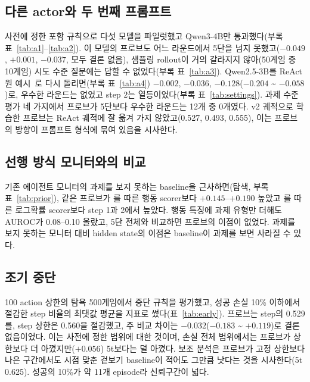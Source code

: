 \documentclass[10pt]{article}
\begin{document}
\subsection{다른 actor와 두 번째 프롬프트}\label{sec:actors}
사전에 정한 포함 규칙으로 다섯 모델을 파일럿했고 Qwen3-4B만 통과했다(부록 표~\ref{tab:a1}--\ref{tab:a2}). 이 모델의 프로브도 어느 라운드에서 5단을 넘지 못했고($-0.049$, $+0.001$, $-0.037$, 모두 결론 없음), 샘플링 rollout이 거의 갈라지지 않아(50게임 중 10게임) 시도 수준 질문에는 답할 수 없었다(부록 표~\ref{tab:a3}).
Qwen2.5-3B를 ReAct 원 예시~\cite{yao2023react}로 다시 돌리면(부록 표~\ref{tab:a4}) $-0.002$, $-0.036$, $-0.128$($-0.204$ \textasciitilde{} $-0.058$)로, 우수한 라운드는 없었고 step 2는 열등이었다(부록 표~\ref{tab:settings}).
과제 수준 평가 네 가지에서 프로브가 5단보다 우수한 라운드는 12개 중 0개였다. v2 궤적으로 학습한 프로브는 ReAct 궤적에 잘 옮겨 가지 않았고(0.527, 0.493, 0.555), 이는 프로브의 방향이 프롬프트 형식에 묶여 있음을 시사한다.

\subsection{선행 방식 모니터와의 비교}\label{sec:prior}
기존 에이전트 모니터의 과제를 보지 못하는 baseline을 근사하면(탐색, 부록 표~\ref{tab:prior}), 같은 프로브가 \cite{ruan2026doomed}를 따른 행동 scorer보다 $+0.145$--$+0.190$ 높았고 \cite{pham2026agentstop}를 따른 로그확률 scorer보다 step 1과 2에서 높았다.
행동 특징에 과제 유형만 더해도 AUROC가 0.08--0.10 올랐고, 5단 전체와 비교하면 프로브의 이점이 없었다. 과제를 보지 못하는 모니터 대비 hidden state의 이점은 baseline이 과제를 보면 사라질 수 있다.

\subsection{조기 중단}
100 action 상한의 탐욕 500게임에서 중단 규칙을 평가했고, 성공 손실 10\% 이하에서 절감한 step 비율의 최댓값 평균을 지표로 썼다(표~\ref{tab:early}). 프로브는 step의 0.529를, step 상한은 0.560을 절감했고, 주 비교 차이는 $-0.032$($-0.183$ \textasciitilde{} $+0.119$)로 결론 없음이었다. 이는 사전에 정한 범위에 대한 것이며, 손실 전체 범위에서는 프로브가 상한보다 더 아꼈지만($+0.056$) 5t보다는 덜 아꼈다.
보조 분석은 프로브가 고정 상한보다 나은 구간에서도 시점 맞춘 겉보기 baseline이 적어도 그만큼 낫다는 것을 시사한다(5t 0.625). 성공의 10\%가 약 11개 episode라 신뢰구간이 넓다.


\end{document}

